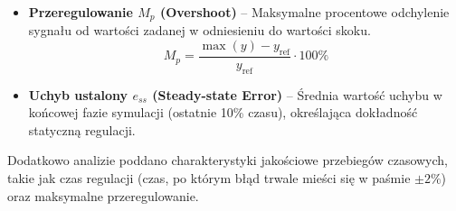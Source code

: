 \begin{itemize}
    \item \textbf{Przeregulowanie $M_p$ (Overshoot)} -- Maksymalne procentowe odchylenie sygnału od wartości zadanej w odniesieniu do wartości skoku.
    \begin{equation}
        M_p = \frac{\max(y) - y_{\mathrm{ref}}}{y_{\mathrm{ref}}} \cdot 100\%
    \end{equation}

    \item \textbf{Uchyb ustalony $e_{ss}$ (Steady-state Error)} -- Średnia wartość uchybu w końcowej fazie symulacji (ostatnie 10\% czasu), określająca dokładność statyczną regulacji.

\end{itemize}

Dodatkowo analizie poddano charakterystyki jakościowe przebiegów czasowych,
takie jak czas regulacji (czas, po którym błąd trwale mieści się w paśmie
$\pm 2\%$) oraz maksymalne przeregulowanie.
